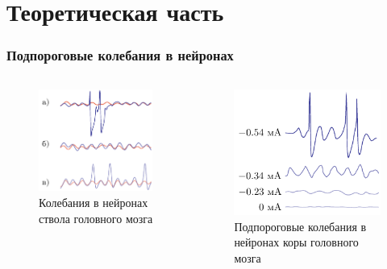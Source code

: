 \section{Теоретическая часть}
\begin{frame}[c]
	\frametitle{Подпороговые колебания в нейронах}
	\begin{columns}
		\begin{column}{0.49\textwidth}
			\begin{figure}[h]
				\centering
				\includegraphics[]{img/img_1a}
				\caption[]{Колебания в нейронах ствола головного мозга}
			\end{figure}
		\end{column}
		\begin{column}{0.49\textwidth}
			\begin{figure}[h]
				\centering
				\includegraphics[]{img/img_1d}	
				\caption[]{Подпороговые колебания в нейронах коры головного мозга}
			\end{figure}
		\end{column}
	\end{columns}
\end{frame}
